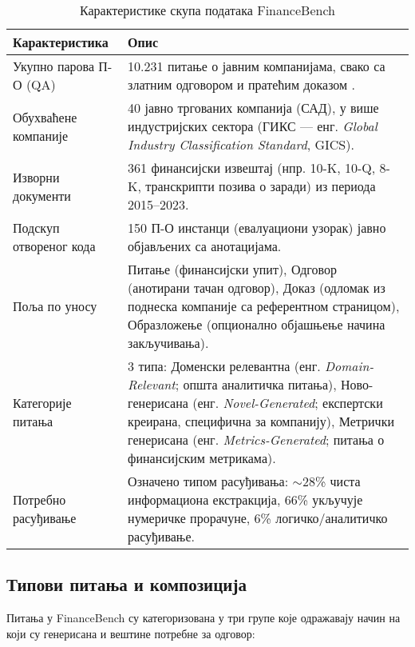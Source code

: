 \begin{table}[h]
\centering
\begin{tabular}{|p{4cm}|p{10cm}|}
\hline
\textbf{Карактеристика} & \textbf{Опис} \\
\hline
Укупно парова П-О (QA) & 10.231 питање о јавним компанијама, свако са златним одговором и пратећим доказом \cite{islam_financebench_2023}. \\
\hline
Обухваћене компаније & 40 јавно тргованих компанија (САД), у више индустријских сектора (ГИКС — енг. \textit{Global Industry Classification Standard}, GICS). \\
\hline
Изворни документи & 361 финансијски извештај (нпр. 10-K, 10-Q, 8-K, транскрипти позива о заради) из периода 2015–2023. \\
\hline
Подскуп отвореног кода & 150 П-О инстанци (евалуациони узорак) јавно објављених са анотацијама. \\
\hline
Поља по уносу & Питање (финансијски упит), Одговор (анотирани тачан одговор), Доказ (одломак из поднеска компаније са референтном страницом), Образложење (опционално објашњење начина закључивања). \\
\hline
Категорије питања & 3 типа: Доменски релевантна (енг. \textit{Domain-Relevant}; општа аналитичка питања), Ново-генерисана (енг. \textit{Novel-Generated}; експертски креирана, специфична за компанију), Метрички генерисана (енг. \textit{Metrics-Generated}; питања о финансијским метрикама). \\
\hline
Потребно расуђивање & Означено типом расуђивања: $\sim$28\% чиста информациона екстракција, 66\% укључује нумеричке прорачуне, 6\% логичко/аналитичко расуђивање. \\
\hline
\end{tabular}
\caption{Карактеристике скупа података FinanceBench}
\label{tab:financebench}
\end{table}

\subsection{Типови питања и композиција}

Питања у FinanceBench су категоризована у три групе које одражавају начин на који су генерисана и вештине потребне за одговор:

